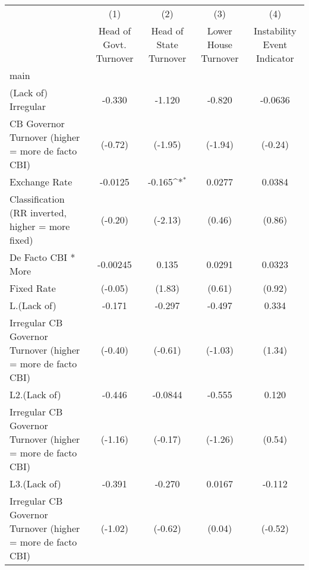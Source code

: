 {
\def\sym#1{\ifmmode^{#1}\else\(^{#1}\)\fi}
\begin{tabular}{l*{4}{c}}
\hline\hline
                    &\multicolumn{1}{c}{(1)}&\multicolumn{1}{c}{(2)}&\multicolumn{1}{c}{(3)}&\multicolumn{1}{c}{(4)}\\
                    &\multicolumn{1}{c}{Head of Govt. Turnover}&\multicolumn{1}{c}{Head of State Turnover}&\multicolumn{1}{c}{Lower House Turnover}&\multicolumn{1}{c}{Instability Event Indicator}\\
\hline
main                &                     &                     &                     &                     \\
(Lack of) Irregular &      -0.330         &      -1.120         &      -0.820         &     -0.0636         \\
CB Governor Turnover (higher = more de facto CBI)&     (-0.72)         &     (-1.95)         &     (-1.94)         &     (-0.24)         \\
[1em]
Exchange Rate       &     -0.0125         &      -0.165\sym{*}  &      0.0277         &      0.0384         \\
Classification (RR inverted, higher = more fixed)&     (-0.20)         &     (-2.13)         &      (0.46)         &      (0.86)         \\
[1em]
De Facto CBI * More &    -0.00245         &       0.135         &      0.0291         &      0.0323         \\
Fixed Rate          &     (-0.05)         &      (1.83)         &      (0.61)         &      (0.92)         \\
[1em]
L.(Lack of)         &      -0.171         &      -0.297         &      -0.497         &       0.334         \\
Irregular CB Governor Turnover (higher = more de facto CBI)&     (-0.40)         &     (-0.61)         &     (-1.03)         &      (1.34)         \\
[1em]
L2.(Lack of)        &      -0.446         &     -0.0844         &      -0.555         &       0.120         \\
Irregular CB Governor Turnover (higher = more de facto CBI)&     (-1.16)         &     (-0.17)         &     (-1.26)         &      (0.54)         \\
[1em]
L3.(Lack of)        &      -0.391         &      -0.270         &      0.0167         &      -0.112         \\
Irregular CB Governor Turnover (higher = more de facto CBI)&     (-1.02)         &     (-0.62)         &      (0.04)         &     (-0.52)         \\

\end{tabular}}
